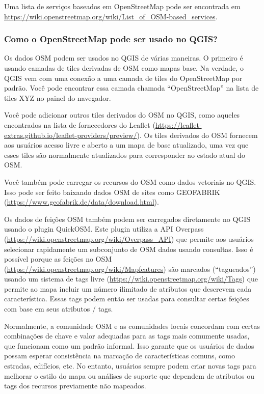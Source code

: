 \documentclass[
]{book}
\begin{document}
Uma lista de serviços baseados em OpenStreetMap pode ser encontrada em \url{https://wiki.openstreetmap.org/wiki/List_of_OSM-based_services}.

\hypertarget{como-o-openstreetmap-pode-ser-usado-no-qgis}{%
\subsubsection{\texorpdfstring{\textbf{Como o OpenStreetMap pode ser usado no QGIS?}}{Como o OpenStreetMap pode ser usado no QGIS?}}\label{como-o-openstreetmap-pode-ser-usado-no-qgis}}

Os dados OSM podem ser usados no QGIS de várias maneiras. O primeiro é usando camadas de tiles derivadas de OSM como mapas base. Na verdade, o QGIS vem com uma conexão a uma camada de tiles do OpenStreetMap por padrão. Você pode encontrar essa camada chamada ``OpenStreetMap'' na lista de tiles XYZ no painel do navegador.

Você pode adicionar outros tiles derivados do OSM no QGIS, como aqueles encontrados na lista de fornecedores do Leaflet (\href{https://leaflet-extras.github\%20.io\%20/\%20leaflet-owners\%20/\%20preview\%20/}{https://leaflet-extras.github.io/leaflet-providers/preview/}). Os tiles derivados do OSM fornecem aos usuários acesso livre e aberto a um mapa de base atualizado, uma vez que esses tiles são normalmente atualizados para corresponder ao estado atual do OSM.

Você também pode carregar os recursos do OSM como dados vetoriais no QGIS. Isso pode ser feito baixando dados OSM de sites como GEOFABRIK (\url{https://www.geofabrik.de/data/download.html}).

Os dados de feições OSM também podem ser carregados diretamente no QGIS usando o plugin QuickOSM. Este plugin utiliza a API Overpass (\url{https://wiki.openstreetmap.org/wiki/Overpass_API}) que permite aos usuários selecionar rapidamente um subconjunto de OSM dados usando consultas. Isso é possível porque as feições no OSM (\url{https://wiki.openstreetmap.org/wiki/Mapfeatures}) são marcados (``tagueados'') usando um sistema de tags livre (\url{https://wiki.openstreetmap.org/wiki/Tags}) que permite ao mapa incluir um número ilimitado de atributos que descrevem cada característica. Essas tags podem então ser usadas para consultar certas feições com base em seus atributos / tags.

Normalmente, a comunidade OSM e as comunidades locais concordam com certas combinações de chave e valor adequadas para as tags mais comumente usadas, que funcionam como um padrão informal. Isso garante que os usuários de dados possam esperar consistência na marcação de características comuns, como estradas, edifícios, etc. No entanto, usuários sempre podem criar novas tags para melhorar o estilo do mapa ou análises de suporte que dependem de atributos ou tags dos recursos previamente não mapeados.
\end{document}
